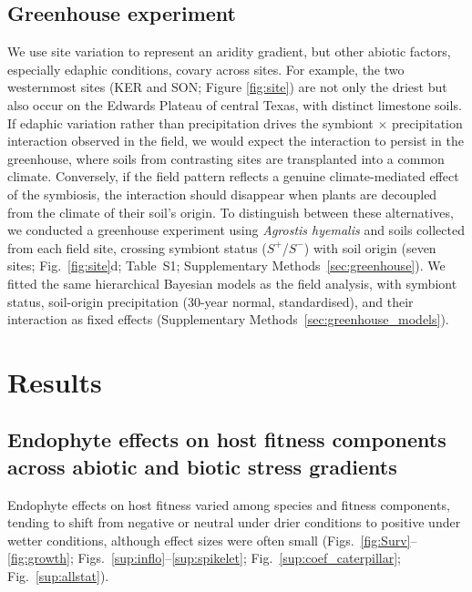 \documentclass[12pt]{article}\usepackage[]{graphicx}\usepackage[dvipsnames]{xcolor}
\begin{document}
\subsection*{Greenhouse experiment}
We use site variation to represent an aridity gradient, but other abiotic factors, especially edaphic conditions, covary across sites. 
For example, the two westernmost sites (KER and SON; Figure \ref{fig:site}) are not only the driest but also occur on the Edwards Plateau of central Texas, with 
distinct limestone soils.
If edaphic variation rather than precipitation drives the symbiont $\times$ precipitation interaction observed in the field, we would expect the interaction to persist in the greenhouse, where soils 
from contrasting sites are transplanted into a common climate. 
Conversely, if the field pattern reflects a genuine climate-mediated effect of the symbiosis, the interaction should disappear when plants are decoupled from the climate of their soil's origin. To distinguish between these alternatives, we conducted a greenhouse experiment using \textit{Agrostis hyemalis} and soils collected from each field site, crossing symbiont status ($S^{+}$/$S^{-}$) with soil origin (seven sites; Fig.~\ref{fig:site}d; 
Table~S1; Supplementary Methods~\ref{sec:greenhouse}).
We fitted the same hierarchical Bayesian models as the field analysis, with symbiont status, soil-origin precipitation (30-year normal, standardised), and their interaction as fixed effects (Supplementary Methods~\ref{sec:greenhouse_models}).

\section*{Results}
\subsection*{Endophyte effects on host fitness components across abiotic and biotic stress gradients}
Endophyte effects on host fitness varied among species and fitness components, tending to shift from negative or neutral under drier conditions to positive under wetter conditions, although effect sizes were often small (Figs.~\ref{fig:Surv}--\ref{fig:growth}; Figs.~\ref{sup:inflo}--\ref{sup:spikelet}; Fig.~\ref{sup:coef_caterpillar}; Fig.~\ref{sup:allstat}). 
\end{document}
